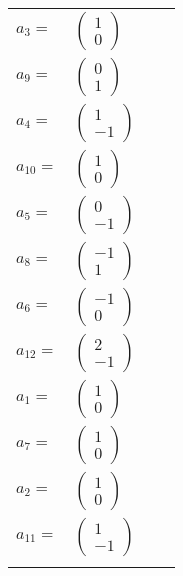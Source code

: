 \documentclass[1p]{elsarticle_modified}
\theoremstyle{definition}
\begin{document}
\begin{tabular}{m{7pt} m{180pt} m{7pt} m{180pt} }
\flushright $a_{3}=$&$\begin{pmatrix}1\\0\end{pmatrix}$ \\
\flushright $a_{9}=$&$\begin{pmatrix}0\\1\end{pmatrix}$ \\
\flushright $a_{4}=$&$\begin{pmatrix}1\\-1\end{pmatrix}$ \\
\flushright $a_{10}=$&$\begin{pmatrix}1\\0\end{pmatrix}$ \\
\flushright $a_{5}=$&$\begin{pmatrix}0\\-1\end{pmatrix}$ \\
\flushright $a_{8}=$&$\begin{pmatrix}-1\\1\end{pmatrix}$ \\
\flushright $a_{6}=$&$\begin{pmatrix}-1\\0\end{pmatrix}$ \\
\flushright $a_{12}=$&$\begin{pmatrix}2\\-1\end{pmatrix}$ \\
\flushright $a_{1}=$&$\begin{pmatrix}1\\0\end{pmatrix}$ \\
\flushright $a_{7}=$&$\begin{pmatrix}1\\0\end{pmatrix}$ \\
\flushright $a_{2}=$&$\begin{pmatrix}1\\0\end{pmatrix}$ \\
\flushright $a_{11}=$&$\begin{pmatrix}1\\-1\end{pmatrix}$\\&\end{tabular}
\end{document}
